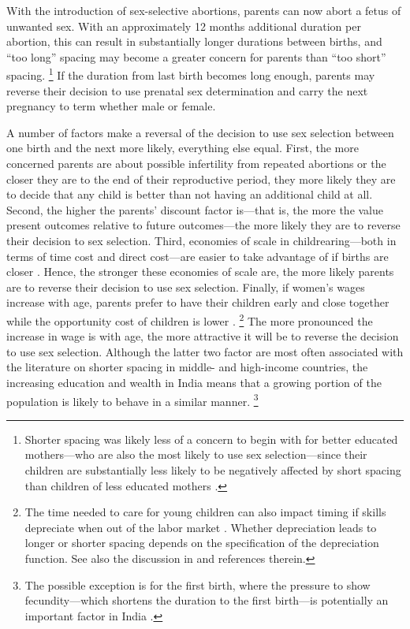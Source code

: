 \documentclass[12pt,letterpaper]{article}
\begin{document}
With the introduction of sex-selective abortions, parents can now abort
a fetus of unwanted sex.
With an approximately 12 months additional duration per abortion,
this can result in substantially longer durations between births, and
``too long'' spacing may become a greater concern for parents than 
``too short'' spacing.%
\footnote{
Shorter spacing was likely less of a concern to begin with for
better educated mothers---who are also the most likely to use 
sex selection---since their children are substantially less likely 
to be negatively affected by short spacing than children of less 
educated mothers \citep{Whitworth2002}.
}
If the duration from last birth becomes long enough, parents may 
reverse their decision to use prenatal sex determination
and carry the next pregnancy to term whether male or female.

A number of factors make a reversal of the decision to use sex 
selection between one birth and the next more likely, 
everything else equal.
First, the more concerned parents are about possible infertility 
from repeated abortions or the closer they are to the end of their 
reproductive period, they more likely they are to decide that any 
child is better than not having an additional child at all.
Second, the higher the parents' discount factor is---that is, the
more the value present outcomes relative to future outcomes---the
more likely they are to reverse their decision to sex selection.
Third, economies of scale in childrearing---both in terms of time cost 
and direct cost---are easier to take advantage of if births 
are closer \citep[p 947]{Newman1984}.
Hence, the stronger these economies of scale are, the more likely
parents are to reverse their decision to use sex selection.
Finally, if women's wages increase with age, parents prefer
to have their children early and close together while 
the opportunity cost of children is lower \citep{Heckman1976}.%
\footnote{
The time needed to care for young children can also impact 
timing if skills depreciate when out of the labor market \citep{Happel1984}.
Whether depreciation leads to longer or shorter spacing depends
on the specification of the depreciation function.
See also the discussion in \citet[p 315]{Hotz1997}
and references therein.
}
The more pronounced the increase in wage is with age, the more 
attractive it will be to reverse the decision to use sex selection.
Although the latter two factor are most often associated with the literature
on shorter spacing in middle- and  high-income countries, 
the increasing education and wealth in India means that a growing 
portion of the population is likely to behave in a similar manner.%
\footnote{
The possible exception is for the first birth, where the pressure to show 
fecundity---which shortens the duration to the first birth---is potentially 
an important factor in India \citep{dyson83,Sethuraman2007,Dommaraju2009}.
}
\end{document}
